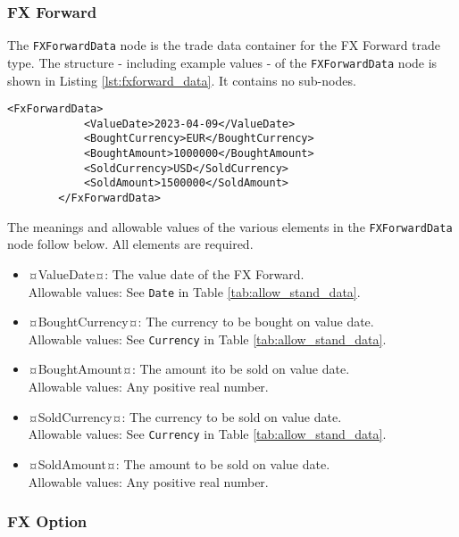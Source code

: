 
\subsubsection{FX Forward}

The \lstinline!FXForwardData!  node is the trade data container for the FX Forward trade type.  The structure - including example values - of the \lstinline!FXForwardData!   node is shown in Listing \ref{lst:fxforward_data}. It contains no sub-nodes.

\begin{lstlisting}[caption=FXForwardData, label=lst:fxforward_data]
        <FxForwardData>
            <ValueDate>2023-04-09</ValueDate>
            <BoughtCurrency>EUR</BoughtCurrency>
            <BoughtAmount>1000000</BoughtAmount>
            <SoldCurrency>USD</SoldCurrency>
            <SoldAmount>1500000</SoldAmount>
        </FxForwardData>
\end{lstlisting}

The meanings and allowable values of the various elements in the \lstinline!FXForwardData!  node follow below.  All elements are required.

\begin{itemize}
\item ¤ValueDate¤: The value date of the FX Forward. \\ Allowable values:  See \lstinline!Date! in Table \ref{tab:allow_stand_data}.
\item ¤BoughtCurrency¤: The currency to be bought on value date.  \\ Allowable values:  See \lstinline!Currency! in Table \ref{tab:allow_stand_data}.
\item ¤BoughtAmount¤: The amount ito be sold on value date.  \\ Allowable values:  Any positive real number.
\item ¤SoldCurrency¤: The currency to be sold on value date.  \\ Allowable values:  See \lstinline!Currency! in Table \ref{tab:allow_stand_data}.
\item ¤SoldAmount¤: The amount to be sold on value date.  \\ Allowable values:  Any positive real number.

\end{itemize}


\subsubsection{FX Option}

